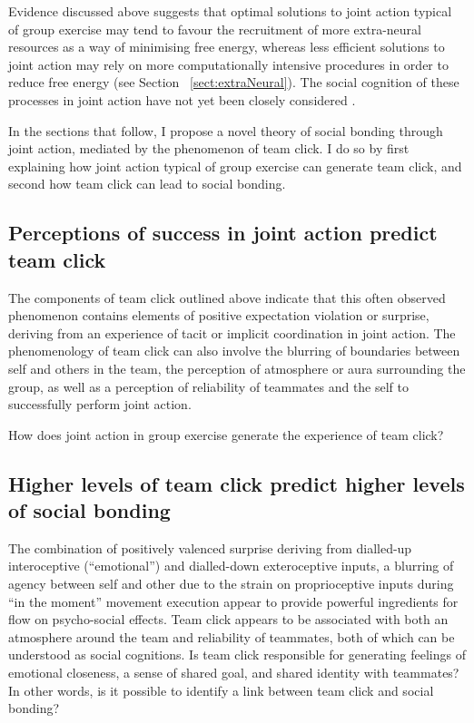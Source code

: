 \begin{CJK}{UTF8}{gbsn}
Evidence discussed above suggests that optimal solutions to joint action typical of group exercise may tend to favour the recruitment of more extra-neural resources as a way of minimising free energy, whereas less efficient solutions to joint action may rely on more computationally intensive procedures in order to reduce free energy (see Section ~\ref{sect:extraNeural}).  The social cognition of these processes in joint action have not yet been closely considered \citep[but see ][]{Marsh2009,Lumsden2012}.


In the sections that follow, I propose a novel theory of social bonding through joint action, mediated by the phenomenon of team click. I do so by first explaining how joint action typical of group exercise can generate team click, and second how team click can lead to social bonding.

\subsection{Perceptions of success in joint action predict team click\label{sect:JASuccessTeamClick}}

The components of team click outlined above indicate that this often observed phenomenon contains elements of positive expectation violation or surprise, deriving from an experience of tacit or implicit coordination in joint action.  The phenomenology of team click can also involve the blurring of boundaries between self and others in the team, the perception of atmosphere or aura surrounding the group, as well as a perception of reliability of teammates and the self to successfully perform joint action.

How does joint action in group exercise generate the experience of team click?


\subsection{Higher levels of team click predict higher levels of social bonding \label{sect:teamClickSocialBonding}}

The combination of positively valenced surprise deriving from dialled-up interoceptive (``emotional'') and dialled-down exteroceptive inputs, a blurring of agency between self and other due to the strain on proprioceptive inputs during ``in the moment'' movement execution appear to provide powerful ingredients for flow on psycho-social effects.  Team click appears to be associated with both an atmosphere around the team and reliability of teammates, both of which can be understood as social cognitions.  Is team click responsible for generating feelings of emotional closeness, a sense of shared goal, and shared identity with teammates?  In other words, is it possible to identify a link between team click and social bonding?


\end{CJK}
